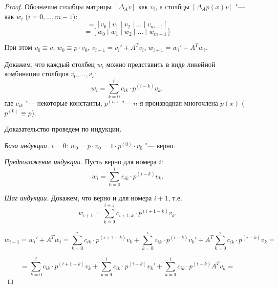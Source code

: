 \begin{proof}

Обозначим столбцы матрицы $[\Delta_A v]$ как $v_i$, а столбцы $[\Delta_A p(x)v]$ "--- как $w_i$ ($i = 0, \dots, m - 1$):
\begin{equation*}
    [\Delta_A v] = [v_0 \mid v_1 \mid v_2 \mid \dots \mid v_{m-1}]
\end{equation*}
\begin{equation*}
    [\Delta_A p(x)v] = [w_0 \mid w_1 \mid w_2 \mid \dots \mid w_{m-1}]
\end{equation*}

При этом $v_0 \equiv v$, $w_0 \equiv p \cdot v_0$, $v_{i+1} = v_{i}' + A^T v_{i}$, $w_{i+1} = w_{i}' + A^T w_{i}$.

Докажем, что каждый столбец $w_i$ можно представить в виде
линейной комбинации столбцов $v_0, \dots, v_i$:
\begin{equation*}
    w_i = \sum\limits_{k = 0}^i c_{ik} \cdot p^{(i - k)} v_k,
\end{equation*}
где $c_{ik}$ "--- некоторые константы, $p^{(n)}$ "--- $n$-я производная многочлена $p(x)$ ($p^{(0)} \equiv p$).

Доказательство проведем по индукции.

\emph{База индукции.} $i = 0$: $w_0 = p \cdot v_0 = 1 \cdot p^{(0)} \cdot v_0$ "--- верно.

\emph{Предположение индукции.} Пусть верно для номера $i$:
\begin{equation*}
    w_i = \sum\limits_{k = 0}^i c_{ik} \cdot p^{(i - k)} v_k.
\end{equation*}

\emph{Шаг индукции.} Докажем, что верно и для номера $i + 1$, т.е.
\begin{equation*}
    w_{i+1} = \sum\limits_{k = 0}^{i+1} c_{i+1, k} \cdot p^{(i + 1 - k)} v_k.
\end{equation*}

\begin{equation*}
    w_{i+1} = w_{i}' + A^T w_{i} = \sum\limits_{k = 0}^i c_{ik} \cdot p^{(i + 1 - k)} v_k +
    \sum\limits_{k = 0}^i c_{ik} \cdot p^{(i - k)} v_k' + A^T \sum\limits_{k = 0}^i c_{ik} \cdot p^{(i - k)} v_k =
\end{equation*}

\begin{equation*}
    = \sum\limits_{k = 0}^i c_{ik} \cdot p^{(i + 1 - k)} v_k +
    \sum\limits_{k = 0}^i c_{ik} \cdot p^{(i - k)} v_k' + \sum\limits_{k = 0}^i c_{ik} \cdot p^{(i - k)} A^T v_k =
\end{equation*}


\end{proof}
